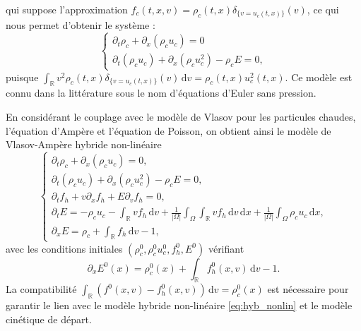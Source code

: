 qui suppose l'approximation $f_c(t,x,v) = \rho_c(t,x)\delta_{\{v=u_c(t,x)\}}(v)$, ce qui nous permet d'obtenir le système :
$$
  \begin{cases}
    \partial_t \rho_c + \partial_x (\rho_cu_c) = 0 \\
    \partial_t (\rho_cu_c) + \partial_x (\rho_cu_c^2) - \rho_cE = 0,
  \end{cases}
$$
puisque $\int_{\mathbb{R}} v^2 \rho_c(t,x)\delta_{\{v=u_c(t,x)\}}(v) \,\mathrm{d}v = \rho_c(t,x) u_c^2 (t,x)$. Ce modèle est connu dans la littérature sous le nom d'équations d'Euler sans pression.

En considérant le couplage avec le modèle de Vlasov pour les particules chaudes, l'équation d'Ampère et l'équation de Poisson, on obtient ainsi le modèle de Vlasov-Ampère hybride non-linéaire
\begin{equation}
  \begin{cases}
    \partial_t \rho_c + \partial_x (\rho_cu_c) = 0, \\
    \partial_t (\rho_cu_c) + \partial_x (\rho_cu_c^2) - \rho_cE = 0, \\
    \partial_t f_h + v\partial_x f_h + E\partial_v f_h = 0, \\
    \partial_t E = -\rho_cu_c -\int_{\mathbb{R}} vf_h\,\mathrm{d}v+ \frac{1}{|\Omega|}\int_\Omega \int_{\mathbb{R}} vf_h\,\mathrm{d}v \,\mathrm{d}x+ \frac{1}{|\Omega|}\int_\Omega \rho_cu_c \,\mathrm{d}x, \\
    \partial_x E = \rho_c + \int_{\mathbb{R}} f_h\,\mathrm{d}v - 1, 
  \end{cases}
\label{eq:hyb_nonlin}
\end{equation}
avec les conditions initiales $(\rho^0_{c}, \rho^0_{c} u^0_{c}, f^0_{h}, E^0)$ vérifiant
$$
  \partial_x E^0(x) = \rho^0_{c}(x)+\int_{\mathbb{R}} f^0_{h}(x, v)\,\mathrm{d}v-1.
$$ 
La compatibilité $\int_{\mathbb{R}} (f^0(x, v) - f^0_h(x, v))\,\mathrm{d}v  = \rho^0_{c}(x)$ est nécessaire pour garantir le lien avec le modèle hybride non-linéaire \eqref{eq:hyb_nonlin} et le modèle cinétique de départ. 

